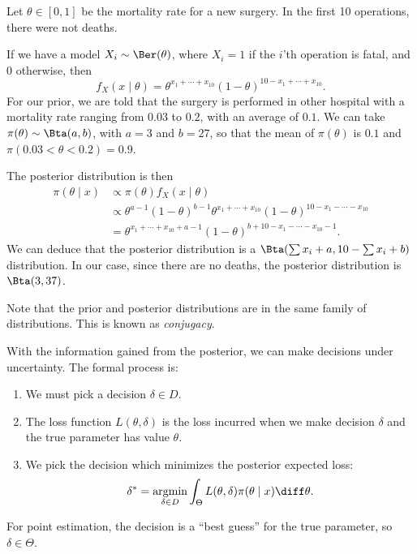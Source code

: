 \documentclass[12pt]{article}
\begin{document}
\begin{exbox}
	Let $\theta \in [0,1]$ be the mortality rate for a new surgery. In the first 10 operations, there were not deaths.

	If we have a model $X_i \sim \Ber(\theta)$, where $X_i = 1$ if the $i$'th operation is fatal, and $0$ otherwise, then
	\[
		f_X(x \mid \theta) = \theta^{x_1 + \cdots + x_{10}}(1 - \theta)^{10 - x_1 + \cdots + x_{10}}
	.\]
	For our prior, we are told that the surgery is performed in other hospital with a mortality rate ranging from $0.03$ to $0.2$, with an average of $0.1$. We can take $\pi(\theta) \sim \Bta(a, b)$, with $a = 3$ and $b = 27$, so that the mean of $\pi(\theta)$ is $0.1$ and $\pi(0.03 < \theta < 0.2) = 0.9$.

	The posterior distribution is then
	\begin{align*}
		\pi(\theta \mid x) &\propto \pi(\theta) f_X(x \mid \theta) \\
				   &\propto \theta^{a-1} (1 - \theta)^{b - 1} \theta^{x_1 + \cdots + x_{10}}(1 - \theta)^{10 - x_1 - \cdots - x_{10}} \\
				   &= \theta^{x_1 + \cdots + x_{10} + a - 1} (1 - \theta)^{b + 10 - x_1 - \cdots - x_{10} - 1}.
	\end{align*}
	We can deduce that the posterior distribution is a $\Bta(\sum x_i + a, 10 - \sum x_i + b)$ distribution. In our case, since there are no deaths, the posterior distribution is $\Bta(3, 37)$.
\end{exbox}

Note that the prior and posterior distributions are in the same family of distributions. This is known as \emph{conjugacy}.

With the information gained from the posterior, we can make decisions under uncertainty. The formal process is:
\begin{enumerate}
	\item We must pick a decision $\delta \in D$.
	\item The loss function $L(\theta, \delta)$ is the loss incurred when we make decision $\delta$ and the true parameter has value $\theta$.
	\item We pick the decision which minimizes the posterior expected loss:
		\[
		\delta^{\ast} = \underset{\delta \in D}{\mathrm{argmin}} \int_{\Theta} L(\theta, \delta) \pi(\theta \mid x) \diff \theta
		.\]
\end{enumerate}

For point estimation, the decision is a ``best guess'' for the true parameter, so $\delta \in \Theta$.
\end{document}
